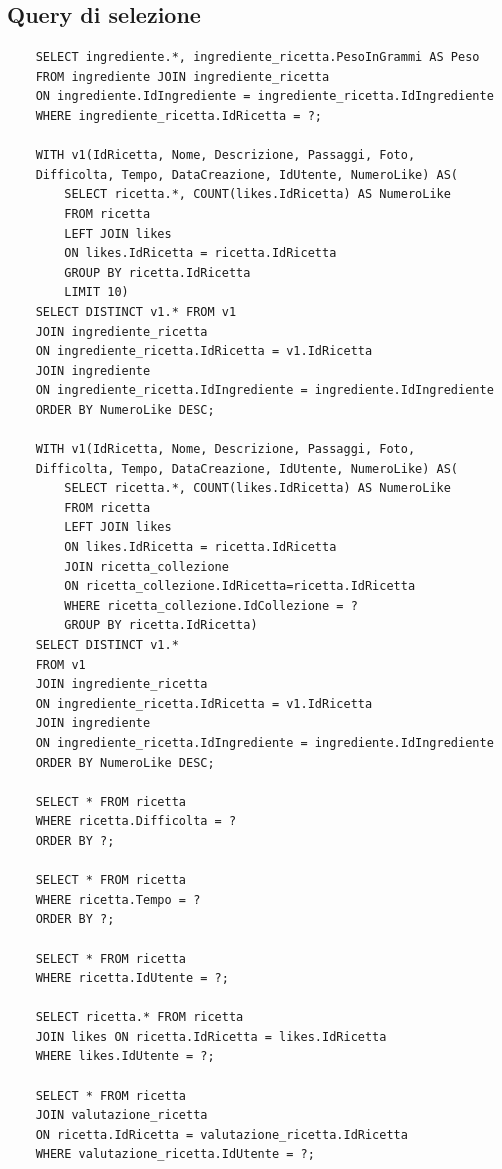 ﻿\documentclass[a4paper,12pt]{report}
\begin{document}
    \subsection{Query di selezione}
    \begin{verbatim}
    SELECT ingrediente.*, ingrediente_ricetta.PesoInGrammi AS Peso
    FROM ingrediente JOIN ingrediente_ricetta
    ON ingrediente.IdIngrediente = ingrediente_ricetta.IdIngrediente
    WHERE ingrediente_ricetta.IdRicetta = ?;
    
    WITH v1(IdRicetta, Nome, Descrizione, Passaggi, Foto,
    Difficolta, Tempo, DataCreazione, IdUtente, NumeroLike) AS(
        SELECT ricetta.*, COUNT(likes.IdRicetta) AS NumeroLike
        FROM ricetta
        LEFT JOIN likes
        ON likes.IdRicetta = ricetta.IdRicetta
        GROUP BY ricetta.IdRicetta
        LIMIT 10)
    SELECT DISTINCT v1.* FROM v1
    JOIN ingrediente_ricetta
    ON ingrediente_ricetta.IdRicetta = v1.IdRicetta
    JOIN ingrediente
    ON ingrediente_ricetta.IdIngrediente = ingrediente.IdIngrediente
    ORDER BY NumeroLike DESC;
    
    WITH v1(IdRicetta, Nome, Descrizione, Passaggi, Foto,
    Difficolta, Tempo, DataCreazione, IdUtente, NumeroLike) AS(
        SELECT ricetta.*, COUNT(likes.IdRicetta) AS NumeroLike
        FROM ricetta
        LEFT JOIN likes
        ON likes.IdRicetta = ricetta.IdRicetta
        JOIN ricetta_collezione
        ON ricetta_collezione.IdRicetta=ricetta.IdRicetta
        WHERE ricetta_collezione.IdCollezione = ?
        GROUP BY ricetta.IdRicetta)
    SELECT DISTINCT v1.*
    FROM v1
    JOIN ingrediente_ricetta
    ON ingrediente_ricetta.IdRicetta = v1.IdRicetta
    JOIN ingrediente
    ON ingrediente_ricetta.IdIngrediente = ingrediente.IdIngrediente
    ORDER BY NumeroLike DESC;
    
    SELECT * FROM ricetta
    WHERE ricetta.Difficolta = ?
    ORDER BY ?;
    
    SELECT * FROM ricetta
    WHERE ricetta.Tempo = ?
    ORDER BY ?;
    
    SELECT * FROM ricetta
    WHERE ricetta.IdUtente = ?;
    
    SELECT ricetta.* FROM ricetta
    JOIN likes ON ricetta.IdRicetta = likes.IdRicetta
    WHERE likes.IdUtente = ?;
    
    SELECT * FROM ricetta
    JOIN valutazione_ricetta
    ON ricetta.IdRicetta = valutazione_ricetta.IdRicetta
    WHERE valutazione_ricetta.IdUtente = ?;
    

\end{verbatim}
\end{document}

